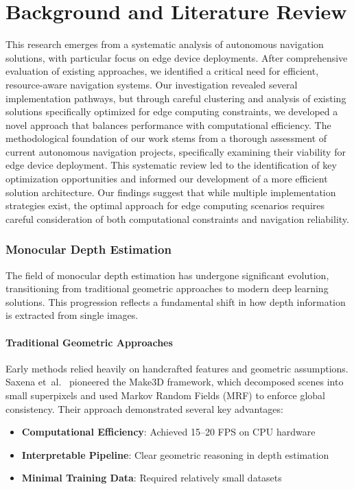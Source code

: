 \documentclass[12pt,oneside]{book}
\begin{document}
\chapter{Background and Literature Review}
This research emerges from a systematic analysis of autonomous navigation solutions, with particular focus on edge device deployments. After comprehensive evaluation of existing approaches, we identified a critical need for efficient, resource-aware navigation systems. Our investigation revealed several implementation pathways, but through careful clustering and analysis of existing solutions specifically optimized for edge computing constraints, we developed a novel approach that balances performance with computational efficiency.
The methodological foundation of our work stems from a thorough assessment of current autonomous navigation projects, specifically examining their viability for edge device deployment. This systematic review led to the identification of key optimization opportunities and informed our development of a more efficient solution architecture. Our findings suggest that while multiple implementation strategies exist, the optimal approach for edge computing scenarios requires careful consideration of both computational constraints and navigation reliability.

\subsection{Monocular Depth Estimation}

The field of monocular depth estimation has undergone significant evolution, transitioning from traditional geometric approaches to modern deep learning solutions. This progression reflects a fundamental shift in how depth information is extracted from single images.

\subsubsection{Traditional Geometric Approaches}
Early methods relied heavily on handcrafted features and geometric assumptions. Saxena et~al.~\cite{saxena2009make3d} pioneered the Make3D framework, which decomposed scenes into small superpixels and used Markov Random Fields (MRF) to enforce global consistency. Their approach demonstrated several key advantages:

\begin{itemize}
    \item \textbf{Computational Efficiency}: Achieved 15--20 FPS on CPU hardware
    \item \textbf{Interpretable Pipeline}: Clear geometric reasoning in depth estimation
    \item \textbf{Minimal Training Data}: Required relatively small datasets
\end{itemize}
\end{document}
